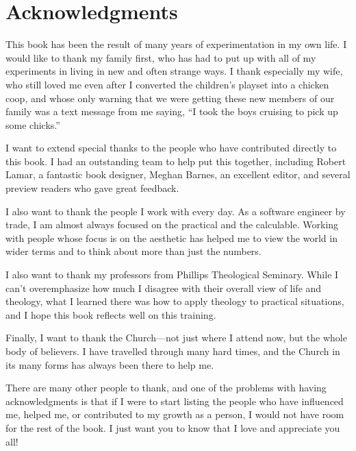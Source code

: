 \chapter*{Acknowledgments}

This book has been the result of many years of experimentation in my own life.
I would like to thank my family first, who has had to put up with all of my 
experiments in living in new and often strange ways.  I thank especially my
wife, who still loved me even after I converted the children's playset into 
a chicken coop, and whose only warning that we were getting these new members
of our family was a text message from me saying,
``I took the boys cruising to pick up some chicks.''  

I want to extend special thanks to the people who have contributed directly
to this book.  I had an outstanding team to help put this together, including
Robert Lamar, a fantastic book designer, Meghan Barnes, an excellent editor,
and several preview readers who gave great feedback.

I also want to thank the people I work with every day.  As a software engineer
by trade, I am almost always focused on the practical and the calculable.
Working with people whose focus is on the aesthetic has helped me to 
view the world in wider terms and to think about more than just the numbers.

I also want to thank my professors from Phillips Theological Seminary.
While I can't overemphasize how much I disagree with their overall view of life
and theology, what I learned there was how to apply theology to
practical situations, and I hope this book reflects well on this training.  

Finally, I want to thank the Church---not just where I attend now, but the 
whole body of believers.  I have travelled through many hard times, and the
Church in its many forms has always been there to help me.

There are many other people to thank, and one of the problems with having acknowledgments
is that if I were to start listing the people who have influenced me, helped me,
or contributed to my growth as a person, I would not have room for the rest
of the book.  I just want you to know that I love and appreciate you all!
